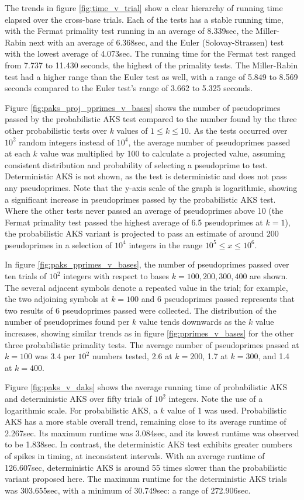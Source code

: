 \documentclass{article}
\begin{document}
The trends in figure \ref{fig:time_v_trial} show a clear hierarchy of running time elapsed over the cross-base trials. Each of the tests has a stable running time, with the Fermat primality test running in an average of 8.339sec, the Miller-Rabin next with an average of 6.368sec, and the Euler (Solovay-Strassen) test with the lowest average of 4.073sec. The running time for the Fermat test ranged from 7.737 to 11.430 seconds, the highest of the primality tests. The Miller-Rabin test had a higher range than the Euler test as well, with a range of 5.849 to 8.569 seconds compared to the Euler test's range of 3.662 to 5.325 seconds.

Figure \ref{fig:paks_proj_pprimes_v_bases} shows the number of pseudoprimes passed by the probabilistic AKS test compared to the number found by the three other probabilistic tests over $k$ values of $1 \leq k \leq 10$. As the tests occurred over $10^2$ random integers instead of $10^4$, the average number of pseudoprimes passed at each $k$ value was multiplied by 100 to calculate a projected value, assuming consistent distribution and probability of selecting a pseudoprime to test. Deterministic AKS is not shown, as the test is deterministic and does not pass any pseudoprimes. Note that the y-axis scale of the graph is logarithmic, showing a significant increase in pseudoprimes passed by the probabilistic AKS test. Where the other tests never passed an average of pseudoprimes above 10 (the Fermat primality test passed the highest average of 6.5 pseudoprimes at $k=1$), the probabilistic AKS variant is projected to pass an estimate of around 200 pseudoprimes in a selection of $10^4$ integers in the range $10^5 \leq x \leq 10^6$.

In figure \ref{fig:paks_pprimes_v_bases}, the number of pseudoprimes passed over ten trials of $10^2$ integers with respect to bases $k=100,200,300,400$ are shown. The several adjacent symbols denote a repeated value in the trial; for example, the two adjoining symbols at $k=100$ and 6 pseudoprimes passed represents that two results of 6 pseudoprimes passed were collected. The distribution of the number of pseudoprimes found per $k$ value tends downwards as the $k$ value increases, showing similar trends as in figure \ref{fig:pprimes_v_bases} for the other three probabilistic primality tests. The average number of pseudoprimes passed at $k = 100$ was 3.4 per $10^2$ numbers tested, 2.6 at $k=200$, 1.7 at $k=300$, and 1.4 at $k=400$.

Figure \ref{fig:paks_v_daks} shows the average running time of probabilistic AKS and deterministic AKS over fifty trials of $10^2$ integers. Note the use of a logarithmic scale. For probabilistic AKS, a $k$ value of 1 was used. Probabilistic AKS has a more stable overall trend, remaining close to its average runtime of 2.267sec. Its maximum runtime was 3.084sec, and its lowest runtime was observed to be 1.838sec. In contrast, the deterministic AKS test exhibits greater numbers of spikes in timing, at inconsistent intervals. With an average runtime of 126.607sec, deterministic AKS is around 55 times slower than the probabilistic variant proposed here. The maximum runtime for the deterministic AKS trials was 303.655sec, with a minimum of 30.749sec: a range of 272.906sec.
\end{document}
